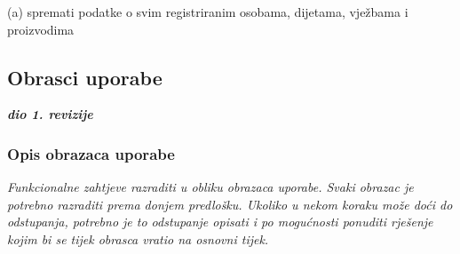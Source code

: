 \begin{packed_enum}
\begin{packed_enum}
				\end{packed_enum}
			
				\item  {}
				
				\begin{packed_enum}
					
					\item (a) spremati podatke o svim registriranim osobama, dijetama, vježbama i proizvodima
					
				\end{packed_enum}
			
			\end{packed_enum}
			
			\eject 
			
			
				
			\subsection{Obrasci uporabe}
				
				\textbf{\textit{dio 1. revizije}}
				
				\subsubsection{Opis obrazaca uporabe}
					\textit{Funkcionalne zahtjeve razraditi u obliku obrazaca uporabe. Svaki obrazac je potrebno razraditi prema donjem predlošku. Ukoliko u nekom koraku može doći do odstupanja, potrebno je to odstupanje opisati i po mogućnosti ponuditi rješenje kojim bi se tijek obrasca vratio na osnovni tijek.}\\
					

